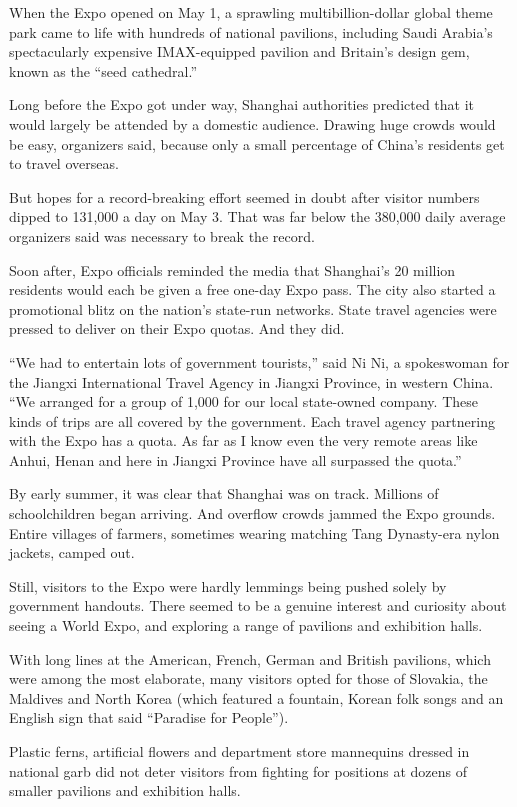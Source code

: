 ﻿\documentclass[12pt]{article}
\begin{document}
When the Expo opened on May 1, a sprawling multibillion-dollar global theme park came to life with
hundreds of national pavilions, including Saudi Arabia's spectacularly expensive IMAX-equipped
pavilion and Britain's design gem, known as the ``seed cathedral.''

Long before the Expo got under way, Shanghai authorities predicted that it would largely be attended
by a domestic audience. Drawing huge crowds would be easy, organizers said, because only a small
percentage of China's residents get to travel overseas.

But hopes for a record-breaking effort seemed in doubt after visitor numbers dipped to 131,000 a day
on May 3. That was far below the 380,000 daily average organizers said was necessary to break the
record.

Soon after, Expo officials reminded the media that Shanghai's 20 million residents would each be
given a free one-day Expo pass. The city also started a promotional blitz on the nation's state-run
networks. State travel agencies were pressed to deliver on their Expo quotas. And they did.

``We had to entertain lots of government tourists,'' said Ni Ni, a spokeswoman for the Jiangxi
International Travel Agency in Jiangxi Province, in western China. ``We arranged for a group of
1,000 for our local state-owned company. These kinds of trips are all covered by the government.
Each travel agency partnering with the Expo has a quota. As far as I know even the very remote areas
like Anhui, Henan and here in Jiangxi Province have all surpassed the quota.''

By early summer, it was clear that Shanghai was on track. Millions of schoolchildren began arriving.
And overflow crowds jammed the Expo grounds. Entire villages of farmers, sometimes wearing matching
Tang Dynasty-era nylon jackets, camped out.

Still, visitors to the Expo were hardly lemmings being pushed solely by government handouts. There
seemed to be a genuine interest and curiosity about seeing a World Expo, and exploring a range of
pavilions and exhibition halls.

With long lines at the American, French, German and British pavilions, which were among the most
elaborate, many visitors opted for those of Slovakia, the Maldives and North Korea (which featured a
fountain, Korean folk songs and an English sign that said ``Paradise for People'').

Plastic ferns, artificial flowers and department store mannequins dressed in national garb did not
deter visitors from fighting for positions at dozens of smaller pavilions and exhibition halls.
\end{document}

